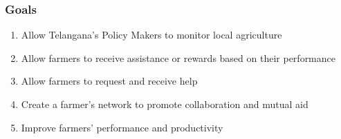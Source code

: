 \documentclass[10pt]{article}
\begin{document}
\subsubsection{Goals}
\begin{enumerate}[label=\textbf{G\arabic*}]
    \item \label{goal:g1} Allow Telangana's Policy Makers to monitor local agriculture
    \item \label{goal:g2} Allow farmers to receive assistance or rewards based on their performance
    \item \label{goal:g3} Allow farmers to request and receive help
    \item \label{goal:g4} Create a farmer's network to promote collaboration and mutual aid 
    \item \label{goal:g5} Improve farmers' performance and productivity
\end{enumerate}
\end{document}
